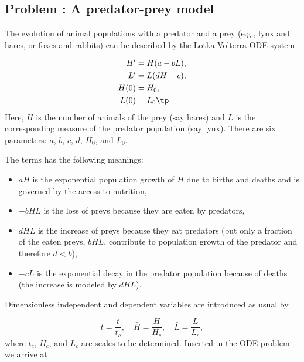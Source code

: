 \documentclass[graybox,envcountchap,sectrefs,final]{svmonodo}
\newenvironment{doconceexercise}{}{}
\newcounter{doconceexercisecounter}
\begin{document}
\begin{doconceexercise}

\subsection*{Problem \thedoconceexercisecounter: A predator-prey model}

\label{scale:decay:exer:predpray}


The evolution of animal populations with a predator and a prey (e.g.,
lynx and hares, or foxes and rabbits) can be described by the
Lotka-Volterra ODE system

\begin{align}
H^{\prime} &= H(a - bL),
\label{scale:decay:exer:predprey:eqH}\\ 
L^{\prime} &= L(dH - c),
\label{scale:decay:exer:predprey:eqL}\\ 
H(0)&=H_0,\\ 
L(0)&=L_0\tp
\end{align}
Here, $H$ is the number of animals of the prey (say hares)
and $L$ is the corresponding measure of the predator population (say lynx).
There are six parameters: $a$, $b$, $c$, $d$, $H_0$, and $L_0$.

The terms has the following meanings:

\begin{itemize}
 \item $aH$ is the exponential
   population growth of $H$ due to births and deaths and is governed by
   the access to nutrition,

 \item $-bHL$ is the loss of preys because they are eaten by predators,

 \item $dHL$ is the increase of preys because they eat predators (but only
   a fraction of the eaten preys, $bHL$, contribute to population growth
   of the predator and therefore $d < b$),

 \item $-cL$ is the exponential decay in the predator population because of
   deaths (the increase is modeled by $dHL$).
\end{itemize}

\noindent
Dimensionless independent and dependent variables are introduced as usual
by

\[ \bar t = \frac{t}{t_c},\quad
\bar H = \frac{H}{H_c},\quad \bar L = \frac{L}{L_c},
\]
where $t_c$, $H_c$, and $L_c$ are scales to be determined. Inserted
in the ODE problem we arrive at


\end{doconceexercise}
\end{document}
